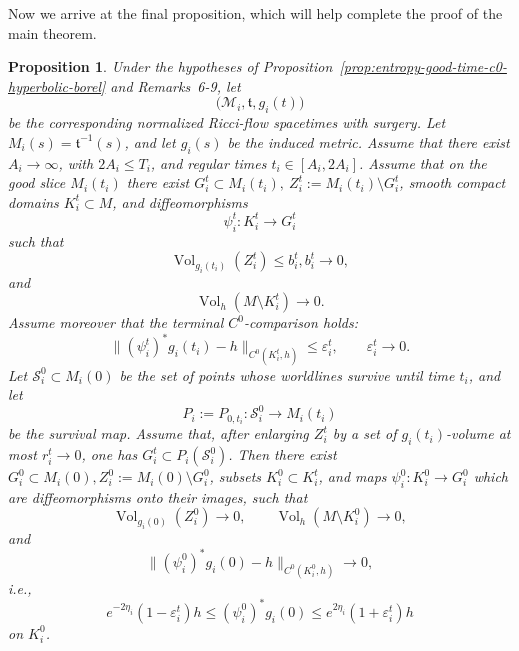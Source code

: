\documentclass{amsart}
\newtheorem{proposition}{Proposition}[section]
\begin{document}
\noindent Now we arrive at the final proposition, which will help complete the proof of the main theorem. 





\begin{proposition}
\label{prop:flowback-c0-comparison-map}
Under the hypotheses of Proposition~\ref{prop:entropy-good-time-c0-hyperbolic-borel} and
Remarks~6-9, let
\[
        \bigl(\mathcal M_i,\mathfrak t,g_i(t)\bigr)
\]
be the corresponding normalized Ricci-flow spacetimes with surgery.
Let \(M_i(s)=\mathfrak t^{-1}(s)\), and let \(g_i(s)\) be the induced metric.
Assume that there exist \(A_i\to\infty\), with \(2A_i\leq T_i\), and regular
times
$t_i\in[A_i,2A_i]$.
Assume that on the good slice \(M_i(t_i)\) there exist 
$G_i^t\subset M_i(t_i),~
        Z_i^t:=M_i(t_i)\setminus G_i^t$,
smooth compact domains \(K_i^t\subset M\), and diffeomorphisms
\[
        \psi_i^t:K_i^t\longrightarrow G_i^t
\]
such that
\[
        \operatorname{Vol}_{g_i(t_i)}(Z_i^t)\leq b_i^t,
        b_i^t\to0,
\]
and
\[
        \operatorname{Vol}_{h}(M\setminus K_i^t)\to0.
\]
Assume moreover that the terminal \(C^0\)-comparison holds:
\[
        \bigl\|(\psi_i^t)^*g_i(t_i)-h\bigr\|_{C^0(K_i^t,h)}
        \leq
        \varepsilon_i^t,
        \qquad
        \varepsilon_i^t\to0.
\]
Let \(\mathcal S_i^0\subset M_i(0)\) be the set of points whose worldlines
survive until time \(t_i\), and let
\[
        P_i:=P_{0,t_i}:\mathcal S_i^0\longrightarrow M_i(t_i)
\]
be the survival map. Assume that, after enlarging \(Z_i^t\) by a set of
\(g_i(t_i)\)-volume at most \(r_i^t\to0\), one has
$G_i^t\subset P_i(\mathcal S_i^0)$.
Then there exist
$G_i^0\subset M_i(0),        
        Z_i^0:=M_i(0)\setminus G_i^0$,
subsets \(K_i^0\subset K_i^t\), and maps
$\psi_i^0:K_i^0\longrightarrow G_i^0$
which are diffeomorphisms onto their images, such that
\[
        \operatorname{Vol}_{g_i(0)}(Z_i^0)\to0,
        \qquad
        \operatorname{Vol}_{h}(M\setminus K_i^0)\to0,
\]
and
\[
        \bigl\|(\psi_i^0)^*g_i(0)-h\bigr\|_{C^0(K_i^0,h)}
        \to0,
\]
i.e.,
\[
        e^{-2\eta_i}(1-\varepsilon_i^t)h
        \leq
        (\psi_i^0)^*g_i(0)
        \leq
        e^{2\eta_i}(1+\varepsilon_i^t)h
\]
on \(K_i^0\).
\end{proposition}
\end{document}
